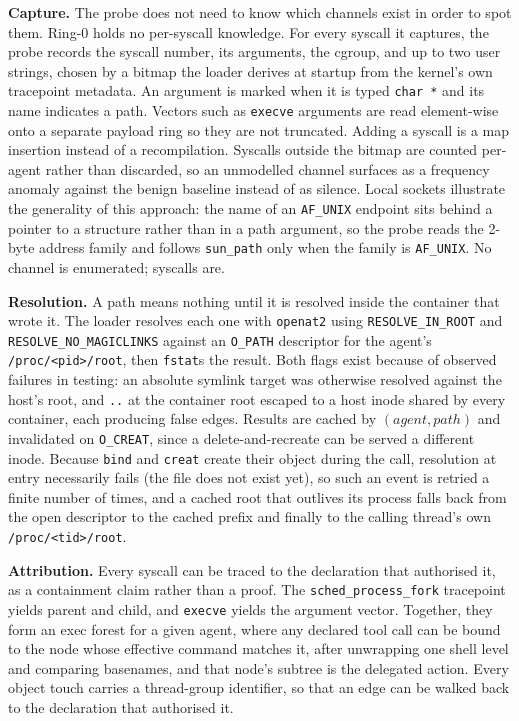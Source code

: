 \documentclass[11pt]{article}
\begin{document}
\noindent\textbf{Capture.} The probe does not need to know which channels exist in order to spot them. Ring-0 holds no per-syscall knowledge. For every syscall it captures, the probe records the syscall number, its arguments, the cgroup, and up to two user strings, chosen by a bitmap the loader derives at startup from the kernel's own tracepoint metadata. An argument is marked when it is typed \texttt{char *} and its name indicates a path. Vectors such as \texttt{execve} arguments are read element-wise onto a separate payload ring so they are not truncated. Adding a syscall is a map insertion instead of a recompilation. Syscalls outside the bitmap are counted per-agent rather than discarded, so an unmodelled channel surfaces as a frequency anomaly against the benign baseline instead of as silence. Local sockets illustrate the generality of this approach: the name of an \texttt{AF\_UNIX} endpoint sits behind a pointer to a structure rather than in a path argument, so the probe reads the 2-byte address family and follows \texttt{sun\_path} only when the family is \texttt{AF\_UNIX}. No channel is enumerated; syscalls are.

\noindent\textbf{Resolution.} A path means nothing until it is resolved inside the container that wrote it. The loader resolves each one with \texttt{openat2} using \texttt{RESOLVE\_IN\_ROOT} and \texttt{RESOLVE\_NO\_MAGICLINKS} against an \texttt{O\_PATH} descriptor for the agent's \texttt{/proc/<pid>/root}, then \texttt{fstat}s the result. Both flags exist because of observed failures in testing: an absolute symlink target was otherwise resolved against the host's root, and \texttt{..} at the container root escaped to a host inode shared by every container, each producing false edges. Results are cached by $(\mathit{agent},\mathit{path})$ and invalidated on \texttt{O\_CREAT}, since a delete-and-recreate can be served a different inode. Because \texttt{bind} and \texttt{creat} create their object during the call, resolution at entry necessarily fails (the file does not exist yet), so such an event is retried a finite number of times, and a cached root that outlives its process falls back from the open descriptor to the cached prefix and finally to the calling thread's own \texttt{/proc/<tid>/root}.

\noindent\textbf{Attribution.} Every syscall can be traced to the declaration that authorised it, as a containment claim rather than a proof. The \texttt{sched\_process\_fork} tracepoint yields parent and child, and \texttt{execve} yields the argument vector. Together, they form an exec forest for a given agent, where any declared tool call can be bound to the node whose effective command matches it, after unwrapping one shell level and comparing basenames, and that node's subtree is the delegated action. Every object touch carries a thread-group identifier, so that an edge can be walked back to the declaration that authorised it.
\end{document}
